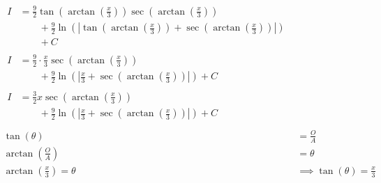 \documentclass[12pt]{article}
\begin{document}
\begin{align}
    \begin{split}
        I &= \frac{9}{2}\tan\left(\arctan\left(\frac{x}{3}\right)\right)\sec\left(\arctan\left(\frac{x}{3}\right)\right) \\
        &\qquad + \frac{9}{2}\ln\left(\left|\tan\left(\arctan\left(\frac{x}{3}\right)\right)+\sec\left(\arctan\left(\frac{x}{3}\right)\right)\right|\right) \\
        &\qquad + C
    \end{split}                                                                                       \\
    \begin{split}
        I                                                & = \frac{9}{2}\cdot\frac{x}{3}\sec\left(\arctan\left(\frac{x}{3}\right)\right) \\
        &\qquad + \frac{9}{2}\ln\left(\left|\frac{x}{3}+\sec\left(\arctan\left(\frac{x}{3}\right)\right)\right|\right) + C
    \end{split}                                                                      \\
    \begin{split}
        I                                                & = \frac{3}{2}x\sec\left(\arctan\left(\frac{x}{3}\right)\right) \\
        &\qquad + \frac{9}{2}\ln\left(\left|\frac{x}{3}+\sec\left(\arctan\left(\frac{x}{3}\right)\right)\right|\right) + C
    \end{split}                                                                                     \\
    \nonumber                                                                                                                                                                                            \\
    \tan(\theta)                                     & = \frac{O}{A}                                                                                                                                     \\
    \arctan(\frac{O}{A})                             & = \theta                                                                                                                                          \\
    \arctan\left(\frac{x}{3}\right) = \theta         & \implies \tan(\theta) = \frac{x}{3}                                                                                                               \\

\end{align}
\end{document}
